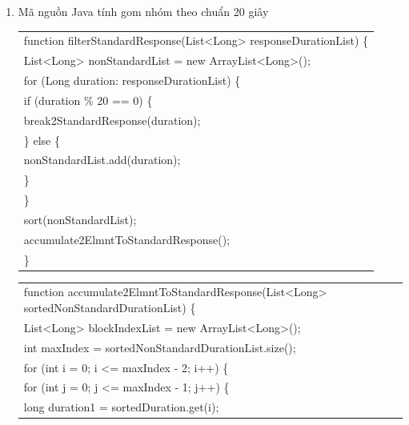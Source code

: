 \documentclass[a4paper, 13pt]{report}
\begin{document}
\begin{enumerate}[label=\textbf{PL\arabic*}]
\item \label{dongbohoa20} Mã nguồn Java tính gom nhóm theo chuẩn 20 giây 
\begin{flushleft}
\begin{tabular}{ |l| }
\hline
function filterStandardResponse(List<Long> responseDurationList) \{\\
\hspace{0.5cm} List<Long> nonStandardList = new ArrayList<Long>();\\
\hspace{0.5cm} for (Long duration: responseDurationList) \{\\
\hspace{1cm} if (duration \% 20 == 0) \{\\
\hspace{1.5cm} break2StandardResponse(duration);\\
\hspace{1cm} \} else \{\\
\hspace{1.5cm} nonStandardList.add(duration); \\
\hspace{1cm} \}\\
\hspace{0.5cm} \}\\
\hspace{0.5cm} sort(nonStandardList);\\
\hspace{0.5cm} accumulate2ElmntToStandardResponse();\\
\}\\
\hline
\end{tabular}
\end{flushleft}
\begin{flushleft}
\begin{tabular}{ |l| }
\hline
function accumulate2ElmntToStandardResponse(List<Long> sortedNonStandardDurationList) \{\\
\hspace{0.5cm} List<Long> blockIndexList = new ArrayList<Long>();\\
\hspace{0.5cm} int maxIndex = sortedNonStandardDurationList.size();\\
\hspace{0.5cm} for (int i = 0; i <= maxIndex - 2; i++) \{\\
\hspace{1cm}   for (int j = 0; j <= maxIndex - 1; j++) \{\\
\hspace{1.5cm} long duration1 = sortedDuration.get(i); \\

\end{tabular}
\end{flushleft}
\end{enumerate}
\end{document}
